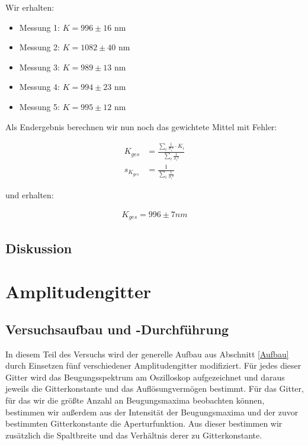 \documentclass[12pt]{article}
\begin{document}
Wir erhalten:

\begin{itemize}
\item Messung 1: $K = 996 \pm 16$ nm
\item Messung 2: $K = 1082 \pm 40$ nm
\item Messung 3: $K = 989 \pm 13$ nm
\item Messung 4: $K = 994 \pm 23$ nm
\item Messung 5: $K = 995 \pm 12$ nm
\end{itemize}

Als Endergebnis berechnen wir nun noch das gewichtete Mittel mit Fehler:

\begin{align*}
K_{ges} &=\frac{\sum\limits_i \frac{1}{\sigma_i²} \cdot K_i}{\sum\limits_i \frac{1}{\sigma_i²}}\\
s_{K_{ges}} &= \frac{1}{\sum\limits_i \frac{1}{\sigma_i²}}
\end{align*}

und erhalten:

\begin{align*}
K_{ges} = 996 \pm 7 nm
\end{align*}

\newpage
\subsection{Diskussion}





\newpage
\section{Amplitudengitter}


\subsection{Versuchsaufbau und -Durchführung}

In diesem Teil des Versuchs wird der generelle Aufbau aus Abschnitt \ref{Aufbau} durch Einsetzen fünf verschiedener Amplitudengitter modifiziert. Für jedes dieser Gitter wird das Beugungsspektrum am Oszilloskop aufgezeichnet und daraus jeweils die Gitterkonstante und das Auflösungvermögen bestimmt. Für das Gitter, für das wir die größte Anzahl an Beugungsmaxima beobachten können, bestimmen wir außerdem aus der Intensität der Beugungsmaxima und der zuvor bestimmten Gitterkonstante  die Aperturfunktion. Aus dieser bestimmen wir zusätzlich die Spaltbreite und das Verhältnis derer zu Gitterkonstante.
\end{document}
